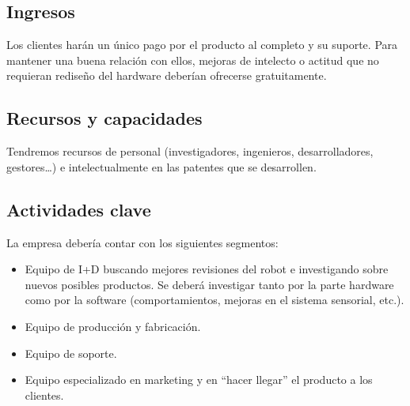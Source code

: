 \subsection{Ingresos}


Los clientes harán un único pago por el producto al completo y su suporte. Para mantener una buena relación con ellos, mejoras de intelecto o actitud que no requieran rediseño del hardware deberían ofrecerse gratuitamente.

\subsection{Recursos y capacidades}


Tendremos recursos de personal (investigadores, ingenieros, desarrolladores, gestores\dots) e intelectualmente en las patentes que se desarrollen.

\subsection{Actividades clave}


La empresa debería contar con los siguientes segmentos:
\begin{itemize}
    \item Equipo de I+D buscando mejores revisiones del robot e investigando sobre nuevos posibles productos. Se deberá investigar tanto por la parte hardware como por la software (comportamientos, mejoras en el sistema sensorial, etc.).
    \item Equipo de producción y fabricación.
    \item Equipo de soporte.
    \item Equipo especializado en marketing y en ``hacer llegar'' el producto a los clientes.
\end{itemize}

